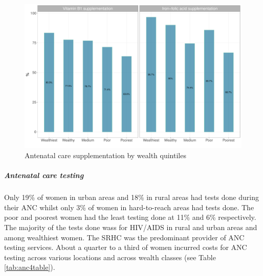\documentclass[12pt,a4paper]{article}
\let\oldsubparagraph\subparagraph
\renewcommand{\subparagraph}[1]{\oldsubparagraph{#1}\mbox{}}
\begin{document}
\begin{figure}[H]

{\centering \includegraphics{kayinReport_files/figure-latex/anc4Plot-1} 

}

\caption{Antenatal care supplementation by wealth quintiles}\label{fig:anc4Plot}
\end{figure}

\hypertarget{ancTesting}{%
\subparagraph{Antenatal care testing}\label{ancTesting}}

Only 19\% of women in urban areas and 18\% in rural areas had tests done during their ANC whilst only 3\% of women in hard-to-reach areas had tests done. The poor and poorest women had the least testing done at 11\% and 6\% respectively. The majority of the tests done wass for HIV/AIDS in rural and urban areas and among wealthiest women. The SRHC was the predominant provider of ANC testing services. About a quarter to a third of women incurred costs for ANC testing across various locations and across wealth classes (see Table \ref{tab:anc4table}).
\end{document}
